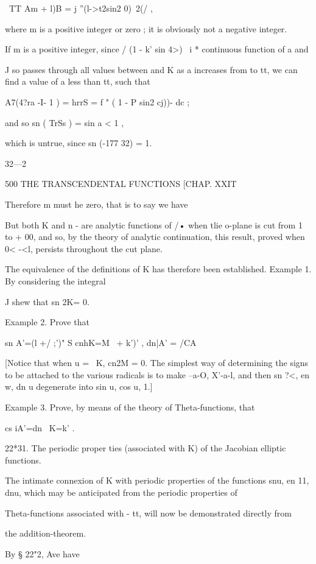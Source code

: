 \ TT Am + l)B = j ''(l->t2sin2 0)~2(/ , 

where m is a positive integer or zero ; it is obviously not a negative integer. 

If m is a positive integer, since / (1 - k'  sin  4>)~   i  * continuous function of a and 

J 
so passes through all values between and K as a increases from to  tt, we can find 
a value of a less than  tt, such that 

A7(4?ra -I- 1 ) = hrrS  = f " ( 1 - P sin2 cj))-  dc  ; 

and so sn ( TrSs ) = sin a < 1 , 

which is untrue, since sn (-177 32) = 1. 

32—2 



500 THE TRANSCENDENTAL FUNCTIONS [CHAP. XXIT 

Therefore m must he zero, that is to say we have 

But both K and  n - are analytic functions of /• when tlie o-plane is cut from 1 to 
+ 00, and so, by the theory of analytic continuation, this result, proved when 0< -<l, 
persists throughout the cut plane. 

The equivalence of the definitions of K has therefore been established. 
Example 1. By considering the integral 

J 
shew that sn 2K= 0. 

Example 2. Prove that 

sn A'=(l +/ ;')" S cnhK=M  \ + k')' , dn|A' = /CA 

[Notice that when u = \ K, cn2M = 0. The simplest way of determining the signs to 
be attached to the various radicals is  to make  --a-O, X'-a-l, and then sn ?<, en w, dn u 
degenerate into sin u, cos u, 1.] 

Example 3. Prove, by means of the theory of Theta-functions, that 

cs iA'=dn \ K=k' . 

22*31. The periodic proper ties (associated with K) of the Jacobian 
elliptic functions. 

The intimate connexion of K with periodic properties of the functions 
snu, en 11, dnu, which may be anticipated from the periodic properties of 

Theta-functions associated with - tt, will now be demonstrated directly from 

the addition-theorem. 

By § 22"2, Ave have 

